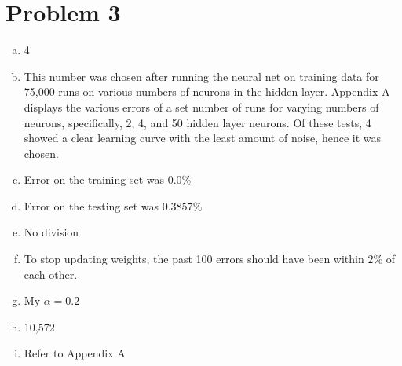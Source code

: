 \documentclass[12pt]{article}%
\begin{document}
\section*{Problem 3}
    \begin{enumerate}[a)]
        \item 4
        \item This number was chosen after running the neural net on training data for 75,000 runs on various numbers of neurons in the hidden layer. Appendix A displays the various errors of a set number of runs for varying numbers of neurons, specifically, 2, 4, and 50 hidden layer neurons. Of these tests, 4 showed a clear learning curve with the least amount of noise, hence it was chosen.
        \item Error on the training set was $0.0\%$
        \item Error on the testing set was $0.3857\%$
        \item No division
        \item To stop updating weights, the past 100 errors should have been within $2\%$ of each other.
        \item My $\alpha = 0.2$
        \item 10,572
        \item Refer to Appendix A
    \end{enumerate}
    
\newpage
\end{document}
